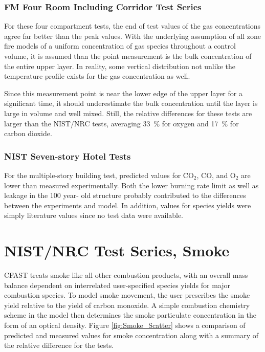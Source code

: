 \subsubsection{FM Four Room Including Corridor Test Series}

For these four compartment tests, the end of test values of the gas concentrations agree far better than the peak values. With the underlying assumption of all zone fire models of a uniform concentration of gas species throughout a control volume,  it is assumed than the point measurement is the bulk concentration of the entire upper layer.  In reality, some vertical distribution not unlike the temperature profile exists for the gas concentration as well. 

Since this measurement point is near the lower edge of the upper layer for a significant time, it 
should underestimate the bulk concentration until the layer is large in volume and well mixed.  Still, the relative differences for these tests are larger than the NIST/NRC tests, averaging 33~\% for oxygen and 17~\% for carbon dioxide.

\subsubsection{NIST Seven-story Hotel Tests}

For the multiple-story building test, predicted values for CO$_2$, CO, and O$_2$ are lower than 
measured experimentally.  Both the lower burning rate limit as well as leakage in the 100 year- 
old structure probably contributed to the differences between the experiments and model.  In 
addition, values for species yields were simply literature values since no test data were available.

\section{NIST/NRC Test Series, Smoke}

CFAST treats smoke like all other combustion products, with an overall mass balance dependent on interrelated user-specified species yields for major combustion species.  To model smoke movement, the user prescribes the smoke yield relative to the yield of carbon monoxide.  A simple combustion chemistry scheme in the model then determines the smoke particulate concentration in the form of an optical density.  Figure \ref{fig:Smoke_Scatter} shows a comparison of predicted and measured values for smoke concentration along with a summary of the relative difference for the tests.

